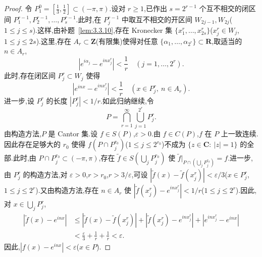 \begin{proof}
令 $P_{1}^{0} = \left[\frac{1}{3}, \frac{1}{2}\right] \subset (-\pi, \pi)$.设对 $r \geq 1$,已作出 $s = 2^{r-1}$ 个互不相交的闭区间 $P_{1}^{r-1}, P_{2}^{r-1}, \ldots, P_{s}^{r-1}$.此时,在 $P_{j}^{r-1}$ 中取互不相交的开区间 $W_{2j-1}, W_{2j}$($1 \leq j \leq s$).这样,由补题~\ref{lem:3.3.10},存在 Kronecker 集 $\{x_{1}^{r}, \ldots, x_{2s}^{r}\}$($x_{j}^{r} \in W_{j}$,$1 \leq j \leq 2s$).这里,存在 $A_{r} \subset \mathbf{Z}$(有限集)使得对任意 $\{\alpha_{1}, \ldots, \alpha_{2^{r}}\} \subset \mathbf{R}$,取适当的 $n \in A_{r}$,
\begin{equation*}
\left|e^{i\alpha_{j}} - e^{inx_{j}^{r}}\right| < \frac{1}{r} \quad (j = 1, \ldots, 2^{r}).
\end{equation*}
此时,存在闭区间 $P_{j}^{r} \subset W_{j}$ 使得
\begin{equation*}
\left|e^{inx} - e^{inx_{j}^{r}}\right| < \frac{1}{r} \quad (x \in P_{j}^{r},\ n \in A_{r}).
\end{equation*}
进一步,设 $P_{j}^{r}$ 的长度 $\left|P_{j}^{r}\right| < 1/r$.如此归纳继续,令
\begin{equation*}
P = \bigcap_{r=1}^{\infty}\bigcup_{j=1}^{2^{r}}P_{j}^{r}.
\end{equation*}
由构造方法,$P$ 是 Cantor 集.设 $f \in S(P)$,$\varepsilon > 0$.由 $f \in C(P)$,$f$ 在 $P$ 上一致连续.因此存在足够大的 $r_{0}$ 使得 $f(P \cap P_{j}^{r_{0}})$($1 \leq j \leq 2^{r_{0}}$)不成为 $\{z \in \mathbf{C}:\ |z| = 1\}$ 的全部.此时,由 $P \cap P_{j}^{r_{0}} \subset (-\pi, \pi)$,存在 $\widetilde{f} \in S\left(\bigcup_{j}P_{j}^{r_{0}}\right)$ 使 $\widetilde{f}\Big|_{P \cap \left(\bigcup_{j}P_{j}^{r_{0}}\right)} = f$.进一步,由 $P_{j}^{r}$ 的构造方法,对 $\varepsilon > 0$,$r > r_{0}$,$r > 3/\varepsilon$,可设 $\left|\widetilde{f}(x) - \widetilde{f}(x_{j}^{r})\right| < \varepsilon/3$($x \in P_{j}^{r}$,$1 \leq j \leq 2^{r}$).又由构造方法,存在 $n \in A_{r}$ 使 $\left|\widetilde{f}(x_{j}^{r}) - e^{inx_{j}^{r}}\right| < 1/r$($1 \leq j \leq 2^{r}$).因此,对 $x \in \bigcup_{j}P_{j}^{r}$,
\begin{align*}
\left|\widetilde{f}(x) - e^{inx}\right| & \leq \left|\widetilde{f}(x) - \widetilde{f}(x_{j}^{r})\right| + \left|\widetilde{f}(x_{j}^{r}) - e^{inx_{j}^{r}}\right| + \left|e^{inx_{j}^{r}} - e^{inx}\right| \\
& < \frac{\varepsilon}{3} + \frac{1}{r} + \frac{1}{r} < \varepsilon.
\end{align*}
因此,$\left|f(x) - e^{inx}\right| < \varepsilon$($x \in P$).
\end{proof}

